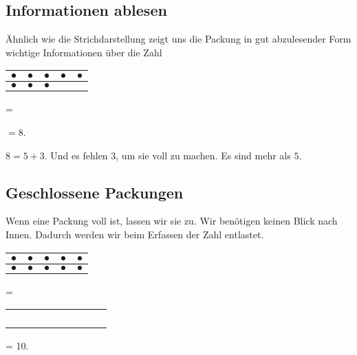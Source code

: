 \documentclass[a4paper]{amsart}
\theoremstyle{definition}
\begin{document}
\subsection{Informationen ablesen}
Ähnlich wie die Strichdarstellung zeigt uns die Packung in gut abzulesender Form wichtige Informationen über die Zahl

\begin{tabular}{|c|c|c|c|c|}
   \hline
   $\bullet$ & $\bullet$ & $\bullet$ & $\bullet$ & $\bullet$\\
   \hline
   $\bullet$ & $\bullet$ & $\bullet$ &  & \\
   \hline
\end{tabular} = 
 $= 8$.

$8 = 5+3$. Und es fehlen $3$, um sie voll zu machen. Es sind mehr als $5$.

\subsection{Geschlossene Packungen}
Wenn eine Packung voll ist, lassen wir sie zu. Wir benötigen keinen Blick nach Innen. Dadurch werden wir beim Erfassen der Zahl entlastet.

\begin{tabular}{|c|c|c|c|c|}
   \hline
   $\bullet$&$\bullet$&$\bullet$&$\bullet$&$\bullet$\\
   \hline
   $\bullet$&$\bullet$&$\bullet$&$\bullet$&$\bullet$\\
   \hline
\end{tabular} = 

\begin{tabular}{|ccccc|}
   \hline
   $\phantom\bullet$&$\phantom\bullet$&$\phantom\bullet$&$\phantom\bullet$&$\phantom\bullet$\\
   $\phantom\bullet$&$\phantom\bullet$&$\phantom\bullet$&$\phantom\bullet$&$\phantom\bullet$\\
   \hline
\end{tabular} = 10.
\end{document}

